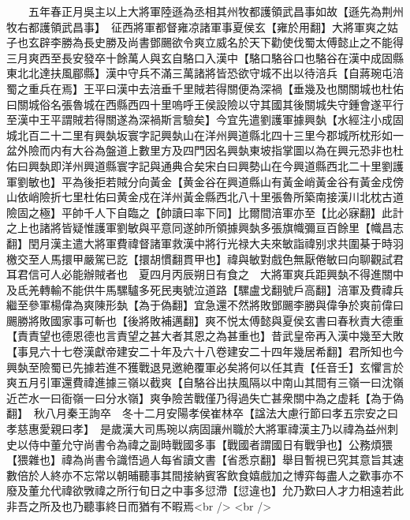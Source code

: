 　　五年春正月吳主以上大將軍陸遜為丞相其州牧都護領武昌事如故【遜先為荆州牧右都護領武昌事】　征西將軍都督雍凉諸軍事夏侯玄【雍於用翻】大將軍爽之姑子也玄辟李勝為長史勝及尚書鄧颺欲令爽立威名於天下勸使伐蜀太傅懿止之不能得三月爽西至長安發卒十餘萬人與玄自駱口入漢中【駱口駱谷口也駱谷在漢中成固縣東北北達扶風郿縣】漢中守兵不滿三萬諸將皆恐欲守城不出以待涪兵【自蔣琬屯涪蜀之重兵在焉】王平曰漢中去涪垂千里賊若得關便為深禍【垂幾及也關關城也杜佑曰關城俗名張魯城在西縣西四十里嗚呼王侯設險以守其國其後關城失守鍾會遂平行至漢中王平謂賊若得關遂為深禍斯言驗矣】今宜先遣劉護軍據興埶【水經注小成固城北百二十二里有興埶坂寰字記興埶山在洋州興道縣北四十三里今郡城所枕形如一盆外險而内有大谷為盤道上數里方及四門因名興埶東坡指掌圖以為在興元恐非也杜佑曰興埶即洋州興道縣寰字記與通典合矣宋白曰興勢山在今興道縣西北二十里劉護軍劉敏也】平為後拒若賊分向黃金【黄金谷在興道縣山有黃金峭黃金谷有黃金戍傍山依峭險折七里杜佑曰黄金戍在洋州黃金縣西北八十里張魯所築南接漢川北枕古道險固之極】平帥千人下自臨之【帥讀曰率下同】比爾間涪軍亦至【比必寐翻】此計之上也諸將皆疑惟護軍劉敏與平意同遂帥所領據興埶多張旗幟彌亘百餘里【幟昌志翻】閏月漢主遣大將軍費禕督諸軍救漢中將行光禄大夫來敏詣禕别求共圍棊于時羽檄交至人馬擐甲嚴駕已訖【擐胡慣翻貫甲也】禕與敏對戲色無厭倦敏曰向聊觀試君耳君信可人必能辦賊者也　夏四月丙辰朔日有食之　大將軍爽兵距興埶不得進關中及氐羌轉輸不能供牛馬騾驢多死民夷號泣道路【騾盧戈翻號戶高翻】涪軍及費禕兵繼至參軍楊偉為爽陳形埶【為于偽翻】宜急還不然將敗鄧颺李勝與偉争於爽前偉曰颺勝將敗國家事可斬也【後將敗補邁翻】爽不悦太傅懿與夏侯玄書曰春秋責大德重【責責望也德恩德也言責望之甚大者其恩之為甚重也】昔武皇帝再入漢中幾至大敗【事見六十七卷漢獻帝建安二十年及六十八卷建安二十四年幾居希翻】君所知也今興埶至險蜀已先據若進不獲戰退見邀絶覆軍必矣將何以任其責【任音壬】玄懼言於爽五月引軍還費禕進據三嶺以截爽【自駱谷出扶風隔以中南山其間有三嶺一曰沈嶺近芒水一曰衙嶺一曰分水嶺】爽争險苦戰僅乃得過失亡甚衆關中為之虚耗【為于偽翻】　秋八月秦王詢卒　冬十二月安陽孝侯崔林卒【諡法大慮行節曰孝五宗安之曰孝慈惠愛親曰孝】　是歲漢大司馬琬以病固讓州職於大將軍禕漢主乃以禕為益州刺史以侍中董允守尚書令為禕之副時戰國多事【戰國者謂國日有戰爭也】公務煩猥【猥雜也】禕為尚書令識悟過人每省讀文書【省悉京翻】舉目暫視已究其意旨其速數倍於人終亦不忘常以朝晡聽事其間接納賓客飲食嬉戲加之博弈每盡人之歡事亦不廢及董允代禕欲斆禕之所行旬日之中事多愆滯【愆違也】允乃歎曰人才力相遠若此非吾之所及也乃聽事終日而猶有不暇焉<br />
<br />
